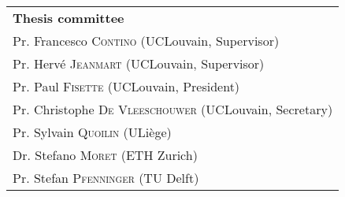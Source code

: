 \begin{titlingpage}
\vspace{\fill}
\begin{small}
\begin{tabular}{l}
\textbf{Thesis committee}\\
\selectfont
Pr. Francesco \textsc{Contino} (UCLouvain, Supervisor) \\ 
Pr. Hervé \textsc{Jeanmart} (UCLouvain, Supervisor) \\ 
Pr. Paul \textsc{Fisette} (UCLouvain, President) \\ 
Pr. Christophe \textsc{De Vleeschouwer} (UCLouvain, Secretary) \\ 
Pr. Sylvain \textsc{Quoilin} (ULiège) \\
Dr. Stefano \textsc{Moret} (ETH Zurich)\\
Pr. Stefan \textsc{Pfenninger} (TU Delft)\\

\end{tabular} 
\end{small}
%
\clearpage

\end{titlingpage}




